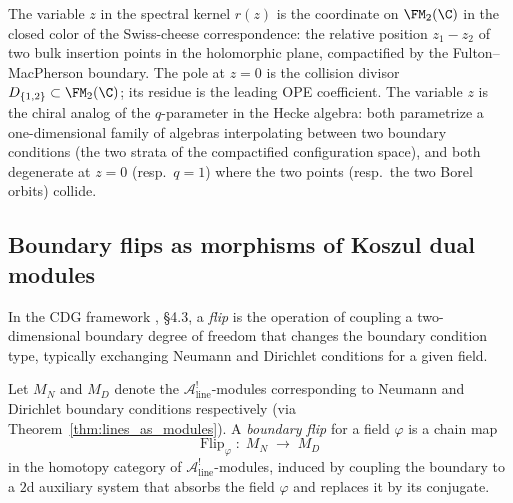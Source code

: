 \begin{remark}
\label{rem:spectral-parameter-fm2}
The variable $z$ in the spectral kernel $r(z)$ is the coordinate on
$\FM_2(\C)$ in the closed color of the Swiss-cheese correspondence:
the relative position $z_1 - z_2$ of two bulk insertion points in
the holomorphic plane, compactified by the Fulton--MacPherson
boundary. The pole at $z = 0$ is the collision divisor
$D_{\{1,2\}} \subset \FM_2(\C)$; its residue is the leading OPE
coefficient. The variable $z$ is the chiral analog of the
$q$-parameter in the Hecke algebra: both parametrize a
one-dimensional family of algebras interpolating between two
boundary conditions (the two strata of the compactified
configuration space), and both degenerate at $z = 0$ (resp.\
$q = 1$) where the two points (resp.\ the two Borel orbits)
collide.
\end{remark}

\subsection{Boundary flips as morphisms of Koszul dual modules}
\label{subsec:boundary-flips}

In the CDG framework \cite{CDG2023}, \S4.3, a \emph{flip} is the operation
of coupling a two-dimensional boundary degree of freedom that changes the
boundary condition type, typically exchanging Neumann and Dirichlet
conditions for a given field.

\begin{definition}[Flip as $\mathcal{A}^!_{\mathrm{line}}$-module morphism]
\label{def:boundary-flip}
Let $M_N$ and $M_D$ denote the $\mathcal{A}^!_{\mathrm{line}}$-modules corresponding to
Neumann and Dirichlet boundary conditions respectively (via
Theorem~\ref{thm:lines_as_modules}). A \emph{boundary flip} for a field
$\varphi$ is a chain map
\begin{equation}\label{eq:flip-morphism}
 \mathrm{Flip}_\varphi \;:\; M_N \;\longrightarrow\; M_D
\end{equation}
in the homotopy category of $\mathcal{A}^!_{\mathrm{line}}$-modules, induced by coupling
the boundary to a $2$d auxiliary system that absorbs the field $\varphi$
and replaces it by its conjugate.
\end{definition}

